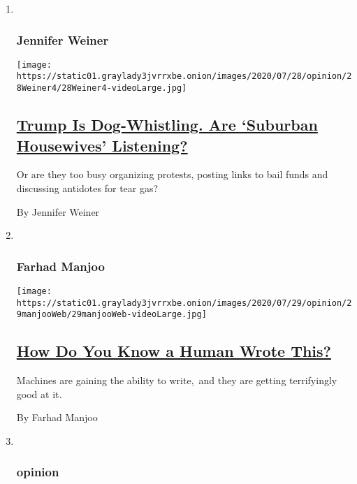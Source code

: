 \begin{enumerate}
\def\labelenumi{\arabic{enumi}.}
\item ~
  \hypertarget{jennifer-weiner}{%
  \subsubsection{Jennifer Weiner}\label{jennifer-weiner}}

  \texttt{[image: https://static01.graylady3jvrrxbe.onion/images/2020/07/28/opinion/28Weiner4/28Weiner4-videoLarge.jpg]}

  \hypertarget{trump-is-dog-whistling-are-suburban-housewives-listening}{%
  \subsection{\texorpdfstring{\href{/2020/07/28/opinion/trump-white-women.html}{Trump
  Is Dog-Whistling. Are `Suburban Housewives'
  Listening?}}{Trump Is Dog-Whistling. Are `Suburban Housewives' Listening?}}\label{trump-is-dog-whistling-are-suburban-housewives-listening}}

  Or are they too busy organizing protests, posting links to bail funds
  and discussing antidotes for tear gas?

  By Jennifer Weiner
\item ~
  \hypertarget{farhad-manjoo}{%
  \subsubsection{Farhad Manjoo}\label{farhad-manjoo}}

  \texttt{[image: https://static01.graylady3jvrrxbe.onion/images/2020/07/29/opinion/29manjooWeb/29manjooWeb-videoLarge.jpg]}

  \hypertarget{how-do-you-know-a-human-wrote-this}{%
  \subsection{\texorpdfstring{\href{/2020/07/29/opinion/gpt-3-ai-automation.html}{How
  Do You Know a Human Wrote
  This?}}{How Do You Know a Human Wrote This?}}\label{how-do-you-know-a-human-wrote-this}}

  Machines are gaining the ability to write,~and they are getting
  terrifyingly good at it.

  By Farhad Manjoo
\item ~
  \hypertarget{opinion-1}{%
  \subsubsection{opinion}\label{opinion-1}}


\end{enumerate}
